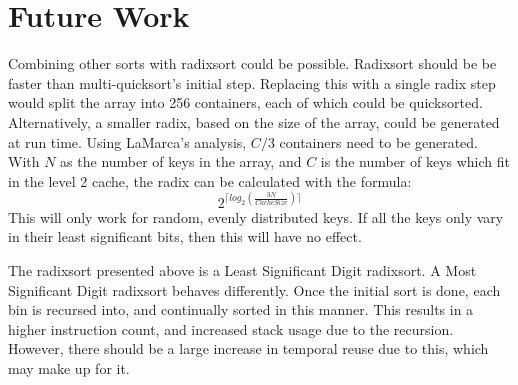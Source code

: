 \section{Future Work}
\label{radix future work}
Combining other sorts with radixsort could be possible.  Radixsort should be be
faster than multi-quicksort's initial step. Replacing this with a single radix
step would split the array into 256 containers, each of which could be
quicksorted. Alternatively, a smaller radix, based on the size of the array,
could be generated at run time. Using LaMarca's analysis, $C/3$ containers need
to be generated. With $N$ as the number of keys in the array, and $C$ is the
number of keys which fit in the level 2 cache, the radix can be calculated with
the formula:
$$2^{\lceil{}log_2(\frac{3N}{CacheSize})\rceil{}}$$
This will only work for random, evenly distributed keys. If all the keys only
vary in their least significant bits, then this will have no effect.

The radixsort presented above is a Least Significant Digit radixsort. A Most
Significant Digit radixsort behaves differently. Once the initial sort is done,
each bin is recursed into, and continually sorted in this manner. This results
in a higher instruction count, and increased stack usage due to the recursion.
However, there should be a large increase in temporal reuse due to this, which
may make up for it.
